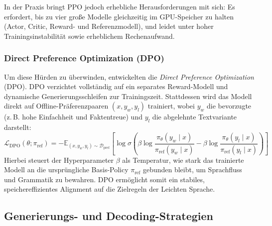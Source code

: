In der Praxis bringt PPO jedoch erhebliche Herausforderungen mit sich: Es erfordert, bis zu vier große Modelle gleichzeitig im GPU-Speicher zu halten (Actor, Critic, Reward- und Referenzmodell), und leidet unter hoher Trainingsinstabilität sowie erheblichem Rechenaufwand.

\subsubsection{Direct Preference Optimization (DPO)}
\label{sec:dpo_theorie}
Um diese Hürden zu überwinden, entwickelten \citet{rafailov2023direct} die \textit{Direct Preference Optimization} (DPO). DPO verzichtet vollständig auf ein separates Reward-Modell und dynamische Generierungsschleifen zur Trainingszeit. Stattdessen wird das Modell direkt auf Offline-Präferenzpaaren $(x, y_w, y_l)$ trainiert, wobei $y_w$ die bevorzugte (z.\,B. hohe Einfachheit und Faktentreue) und $y_l$ die abgelehnte Textvariante darstellt:
\begin{equation}
    \mathcal{L}_{\text{DPO}}(\theta; \pi_{\text{ref}}) = - \mathbb{E}_{(x, y_w, y_l) \sim \mathcal{D}_{\text{pref}}} \left[ \log \sigma \left( \beta \log \frac{\pi_\theta(y_w \mid x)}{\pi_{\text{ref}}(y_w \mid x)} - \beta \log \frac{\pi_\theta(y_l \mid x)}{\pi_{\text{ref}}(y_l \mid x)} \right) \right]
    \label{eq:dpo_loss}
\end{equation}
Hierbei steuert der Hyperparameter $\beta$ als Temperatur, wie stark das trainierte Modell an die ursprüngliche Basis-Policy $\pi_{\text{ref}}$ gebunden bleibt, um Sprachfluss und Grammatik zu bewahren. DPO ermöglicht somit ein stabiles, speichereffizientes Alignment auf die Zielregeln der Leichten Sprache.

\subsection{Generierungs- und Decoding-Strategien}
\label{sec:decoding_strategien_theorie}

